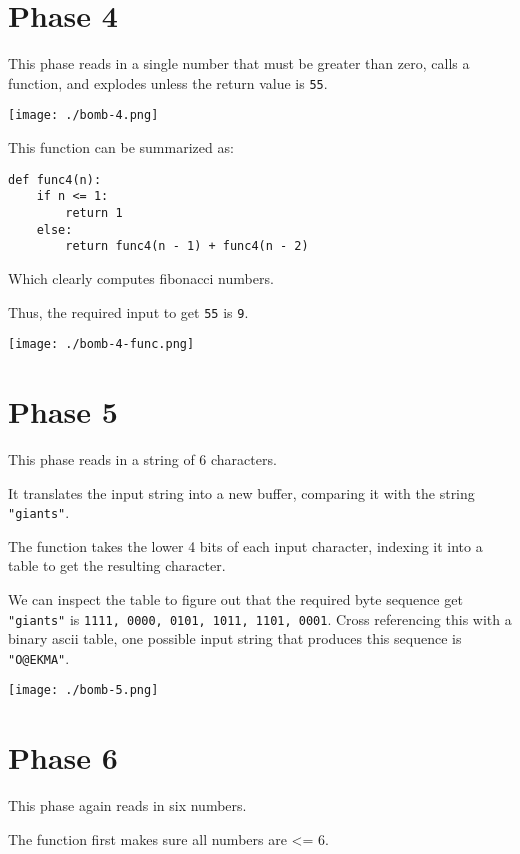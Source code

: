 \documentclass[11pt]{article}
\begin{document}
\section{Phase 4}
\label{sec:org38f0118}
This phase reads in a single number that must be greater than zero,
calls a function, and explodes unless the return value is \texttt{55}.

\begin{center}
\texttt{[image: ./bomb-4.png]}
\end{center}

This function can be summarized as:

\begin{verbatim}
def func4(n):
    if n <= 1:
        return 1
    else:
        return func4(n - 1) + func4(n - 2)
\end{verbatim}

Which clearly computes fibonacci numbers.

Thus, the required input to get \texttt{55} is \texttt{9}.

\begin{center}
\texttt{[image: ./bomb-4-func.png]}
\end{center}
\section{Phase 5}
\label{sec:orgce04ad2}
This phase reads in a string of 6 characters.

It translates the input string into a new buffer, comparing it with
the string \texttt{"giants"}.

The function takes the lower 4 bits of each input character, indexing
it into a table to get the resulting character.

We can inspect the table to figure out that the required byte sequence
get \texttt{"giants"} is \texttt{1111, 0000, 0101, 1011, 1101, 0001}. Cross
referencing this with a binary ascii table, one possible input string
that produces this sequence is \texttt{"O@EKMA"}.

\begin{center}
\texttt{[image: ./bomb-5.png]}
\end{center}
\section{Phase 6}
\label{sec:orga696134}
This phase again reads in six numbers.

The function first makes sure all numbers are <= 6.
\end{document}
